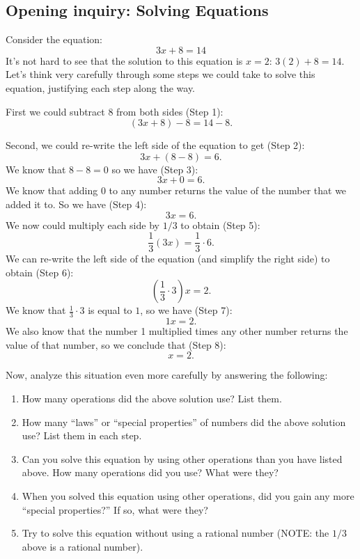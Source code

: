 \documentclass[11pt]{article}
\newenvironment{task}
	{\begin{mdframed}[linecolor=lightgray, linewidth=3pt]\raggedright}
	{\end{mdframed}}
\theoremstyle{definition}
\begin{document}
\subsection{Opening inquiry: Solving Equations}
\begin{task}
  Consider the equation:
\[ 3x + 8 = 14 \]
It's not hard to see that the solution to this equation is $x=2$: $3(2)+8 = 14$. Let's think very carefully through some steps we could take to solve this equation, justifying each step along the way. 

First we could subtract $8$ from both sides (Step 1):
\[ (3x+8)-8 = 14 -8.\]

Second, we could re-write the left side of the equation to get (Step 2):
\[ 3x + (8-8) = 6.\]
We know that $8-8=0$ so we have (Step 3):
\[ 3x + 0 = 6.\]
We know that adding 0 to any number returns the value of the number that we added it to. So we have (Step 4):
\[ 3x = 6.\]
We now could multiply each side by $1/3$ to obtain (Step 5):
\[ \frac{1}{3}(3x) = \frac{1}{3}\cdot 6. \]
We can re-write the left side of the equation (and simplify the right side) to obtain (Step 6):
\[ \left( \frac{1}{3}\cdot 3 \right)x = 2. \]
We know that $\frac{1}{3}\cdot 3$ is equal to $1$, so we have (Step 7):
\[ 1x = 2.\]
We also know that the number 1 multiplied times any other number returns the value of that number, so we conclude that (Step 8):
\[ x = 2.\]

Now, analyze this situation even more carefully by answering the following:
\begin{enumerate}
  \item How many operations did the above solution use? List them.
  \item How many ``laws'' or ``special properties'' of numbers did the above solution use? List them in each step. 
  
  \item Can you solve this equation by using other operations than you have listed above. How many operations did you use? What were they? 
  \item When you solved this equation using other operations, did you gain any more ``special properties?'' If so, what were they?
  \item Try to solve this equation without using a rational number (NOTE: the $1/3$ above is a rational number).
\end{enumerate}
\end{task}
\end{document}
